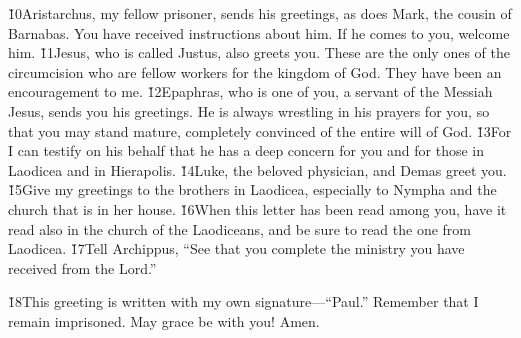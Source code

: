 \v{10}Aristarchus, my fellow prisoner, sends his greetings, as does Mark, the cousin of Barnabas. You have received instructions about him. If he comes to you, welcome him. \v{11}Jesus, who is called Justus, also greets you. These are the only ones of the circumcision who are fellow workers for the kingdom of God. They have been an encouragement to me. \v{12}Epaphras, who is one of you, a servant of the Messiah Jesus, sends you his greetings. He is always wrestling in his prayers for you, so that you may stand mature, completely convinced of the entire will of God. \v{13}For I can testify on his behalf that he has a deep concern for you and for those in Laodicea and in Hierapolis. \v{14}Luke, the beloved physician, and Demas greet you. \v{15}Give my greetings to the brothers in Laodicea, especially to Nympha and the church that is in her house. \v{16}When this letter has been read among you, have it read also in the church of the Laodiceans, and be sure to read the one from Laodicea. \v{17}Tell Archippus, ``See that you complete the ministry you have received from the Lord.''

\v{18}This greeting is written with my own signature---``Paul.'' Remember that I remain imprisoned. May grace be with you! Amen.
